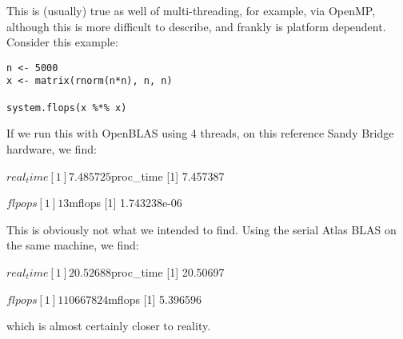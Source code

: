 This is (usually) true as well of multi-threading, for example, via OpenMP, 
although this is more difficult to describe, and frankly is platform dependent. 
 Consider this example:
\begin{lstlisting}[language=rr]
n <- 5000
x <- matrix(rnorm(n*n), n, n)

system.flops(x %*% x)
\end{lstlisting}

If we run this with OpenBLAS using 4 threads, on this reference Sandy Bridge 
hardware, we find:
\begin{Output}
$real_time
[1] 7.485725

$proc_time
[1] 7.457387

$flpops
[1] 13

$mflops
[1] 1.743238e-06
\end{Output}

This is obviously not what we intended to find.  Using the serial Atlas BLAS on 
the same machine, we find:
\begin{Output}
$real_time
[1] 20.52688

$proc_time
[1] 20.50697

$flpops
[1] 110667824

$mflops
[1] 5.396596
\end{Output}

which is almost certainly closer to reality.